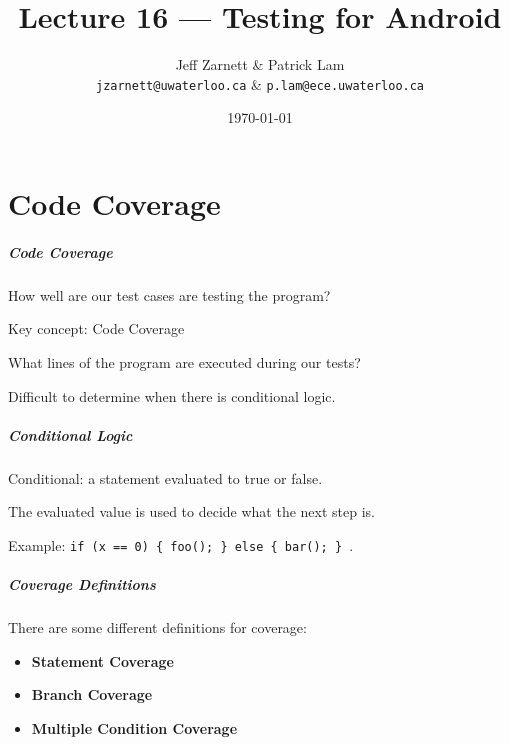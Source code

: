 
\usepackage{alltt}

\title{Lecture 16 --- Testing for Android}

\author{Jeff Zarnett \& Patrick Lam \\ \small \texttt{jzarnett@uwaterloo.ca} \& \texttt{p.lam@ece.uwaterloo.ca}}
\date{\today}



\begin{frame}
  \titlepage

\end{frame}

\part{Code Coverage}
\frame{\partpage}

\begin{frame}
\frametitle{Code Coverage}
\begin{changemargin}{1cm}
How well are our test cases are testing the program?

Key concept: \alert{Code Coverage}

What lines of the program are executed during our tests?

Difficult to determine when there is conditional logic.

\end{changemargin}
\end{frame}


\begin{frame}
\frametitle{Conditional Logic}
\begin{changemargin}{1cm}
Conditional: a statement evaluated to true or false.

The evaluated value is used to decide what the next step is.

Example: \texttt{if (x == 0) \{ foo(); \} else \{ bar(); \} }.

\end{changemargin}
\end{frame}

\begin{frame}
\frametitle{Coverage Definitions}
\begin{changemargin}{1cm}

There are some different definitions for coverage:
\begin{itemize}
	\item \textbf{Statement Coverage} 
	\item \textbf{Branch Coverage} 
	\item \textbf{Multiple Condition Coverage} 
\end{itemize}

\end{changemargin}
\end{frame}


